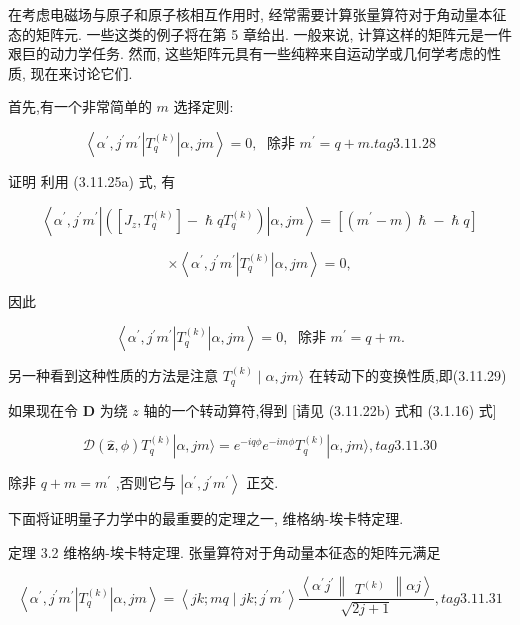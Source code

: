 在考虑电磁场与原子和原子核相互作用时, 经常需要计算张量算符对于角动量本征态的矩阵元. 一些这类的例子将在第 5 章给出. 一般来说, 计算这样的矩阵元是一件艰巨的动力学任务. 然而, 这些矩阵元具有一些纯粹来自运动学或几何学考虑的性质, 现在来讨论它们.

首先,有一个非常简单的 $m$ 选择定则:

$$
\left\langle {{\alpha }^{\prime },{j}^{\prime }{m}^{\prime }\left| {T}_{q}^{\left( k\right) }\right| \alpha ,{jm}}\right\rangle = 0,\;\text{ 除非 }{m}^{\prime } = q + m. tag{3.11.28}
$$

证明 利用 (3.11.25a) 式, 有

$$
\left\langle {{\alpha }^{\prime },{j}^{\prime }{m}^{\prime }\left| \left( {\left\lbrack {{J}_{z},{T}_{q}^{\left( k\right) }}\right\rbrack - \hslash q{T}_{q}^{\left( k\right) }}\right) \right| \alpha ,{jm}}\right\rangle = \left\lbrack {\left( {{m}^{\prime } - m}\right) \hslash - \hslash q}\right\rbrack
$$

$$
\times \left\langle {{\alpha }^{\prime },{j}^{\prime }{m}^{\prime }\left| {T}_{q}^{\left( k\right) }\right| \alpha ,{jm}}\right\rangle = 0,
$$

因此

$$
\left\langle {{\alpha }^{\prime },{j}^{\prime }{m}^{\prime }\left| {T}_{q}^{\left( k\right) }\right| \alpha ,{jm}}\right\rangle = 0,\;\text{ 除非 }{m}^{\prime } = q + m.
$$

另一种看到这种性质的方法是注意 ${T}_{q}^{\left( k\right) } \mid \alpha ,{jm}\rangle$ 在转动下的变换性质,即(3.11.29)


如果现在令 $\mathbf{D}$ 为绕 $z$ 轴的一个转动算符,得到 [请见 (3.11.22b) 式和 (3.1.16) 式]

$$
\mathcal{D}\left( {\widehat{\mathbf{z}},\phi }\right) {T}_{q}^{\left( k\right) }\left| {\alpha ,{jm}\rangle = {e}^{-{iq\phi }}{e}^{-{im\phi }}{T}_{q}^{\left( k\right) }}\right| \alpha ,{jm}\rangle , tag{3.11.30}
$$

除非 $q + m = {m}^{\prime }$ ,否则它与 $\left| {{\alpha }^{\prime },{j}^{\prime }{m}^{\prime }}\right\rangle$ 正交.

下面将证明量子力学中的最重要的定理之一, 维格纳-埃卡特定理.

定理 3.2 维格纳-埃卡特定理. 张量算符对于角动量本征态的矩阵元满足

$$
\left\langle {{\alpha }^{\prime },{j}^{\prime }{m}^{\prime }\left| {T}_{q}^{\left( k\right) }\right| \alpha ,{jm}}\right\rangle = \left\langle {{jk};{mq} \mid {jk};{j}^{\prime }{m}^{\prime }}\right\rangle \frac{\left\langle {\alpha }^{\prime }{j}^{\prime }\begin{Vmatrix}{T}^{\left( k\right) }\end{Vmatrix}\alpha j\right\rangle }{\sqrt{{2j} + 1}}, tag{3.11.31}
$$

